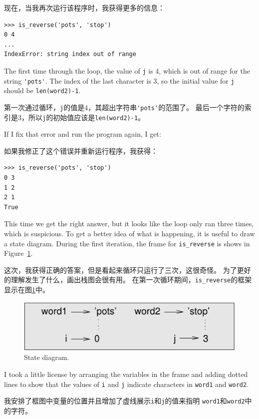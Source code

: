 \documentclass[10pt]{book}
\begin{document}
\begin{CJK}{UTF8}{gbsn}
现在，当我再次运行该程序时，我获得更多的信息：

\begin{verbatim}
>>> is_reverse('pots', 'stop')
0 4
...
IndexError: string index out of range
\end{verbatim}
%
The first time through the loop, the value of {\tt j} is 4,
which is out of range for the string \verb"'pots'".
The index of the last character is 3, so the
initial value for {\tt j} should be {\tt len(word2)-1}.

第一次通过循环，{\tt j}的值是4，其超出字符串\verb"'pots'"的范围了。
最后一个字符的索引是3，所以{\tt j}的初始值应该是{\tt len(word2)-1}。

If I fix that error and run the program again, I get:

如果我修正了这个错误并重新运行程序，我获得：

\begin{verbatim}
>>> is_reverse('pots', 'stop')
0 3
1 2
2 1
True
\end{verbatim}
%
This time we get the right answer, but it looks like the loop only ran
three times, which is suspicious.  To get a better idea of what is
happening, it is useful to draw a state diagram.  During the first
iteration, the frame for \verb"is_reverse" is shows in Figure~\ref{fig.state4}.

这次，我获得正确的答案，但是看起来循环只运行了三次，这很奇怪。
为了更好的理解发生了什么，画出栈图会很有用。
在第一次循环期间，\verb"is_reverse"的框架显示在图\ref{fig.state4}中。

\begin{figure}
\centerline
{\includegraphics[scale=0.8]{figs/state4.pdf}}
\caption{State diagram.}
\label{fig.state4}
\end{figure}


I took a little license by arranging the variables in the frame
and adding dotted lines to show that the values of {\tt i} and
{\tt j} indicate characters in {\tt word1} and {\tt word2}.

我安排了框图中变量的位置并且增加了虚线展示{\tt i}和{\tt j}的值来指明
{\tt word1}和{\tt word2}中的字符。


\end{CJK}
\end{document}

